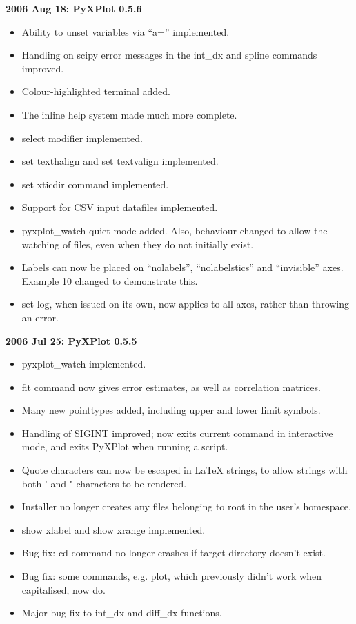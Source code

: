 \documentclass[a4paper,onecolumn,11pt]{book}
\begin{document}
\noindent \textbf{2006 Aug 18: PyXPlot 0.5.6}
\begin{itemize}
\item Ability to unset variables via ``a='' implemented.
\item Handling on scipy error messages in the int\_dx and spline commands improved.
\item Colour-highlighted terminal added.
\item The inline help system made much more complete.
\item select modifier implemented.
\item set texthalign and set textvalign implemented.
\item set xticdir command implemented.
\item Support for CSV input datafiles implemented.
\item pyxplot\_watch quiet mode added. Also, behaviour changed to allow the watching of files, even when they do not initially exist.
\item Labels can now be placed on ``nolabels'', ``nolabelstics'' and ``invisible'' axes. Example 10 changed to demonstrate this.
\item set log, when issued on its own, now applies to all axes, rather than throwing an error.
\end{itemize}

\noindent \textbf{2006 Jul 25: PyXPlot 0.5.5}
\begin{itemize}
\item pyxplot\_watch implemented.
\item fit command now gives error estimates, as well as correlation matrices.
\item Many new pointtypes added, including upper and lower limit symbols.
\item Handling of SIGINT improved; now exits current command in interactive mode, and exits PyXPlot when running a script.
\item Quote characters can now be escaped in LaTeX strings, to allow strings with both ' and " characters to be rendered.
\item Installer no longer creates any files belonging to root in the user's homespace.
\item show xlabel and show xrange implemented.
\item Bug fix: cd command no longer crashes if target directory doesn't exist.
\item Bug fix: some commands, e.g. plot, which previously didn't work when capitalised, now do.
\item Major bug fix to int\_dx and diff\_dx functions.
\end{itemize}
\end{document}
